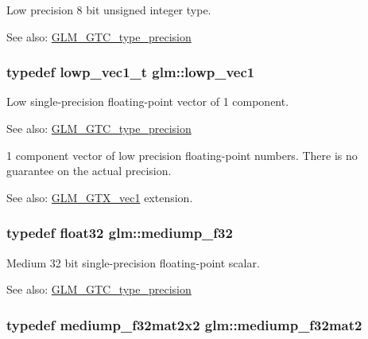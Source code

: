 Low precision 8 bit unsigned integer type. \begin{Desc}
\item[See also:]\hyperlink{group__gtc__type__precision}{GLM\_\-GTC\_\-type\_\-precision} \end{Desc}
\hypertarget{group__gtc__type__precision_ge48c64f920be353ece773ff367f0161c}{
\subsubsection[lowp\_\-vec1]{\setlength{\rightskip}{0pt plus 5cm}typedef lowp\_\-vec1\_\-t {\bf glm::lowp\_\-vec1}}}
\label{group__gtc__type__precision_ge48c64f920be353ece773ff367f0161c}


Low single-precision floating-point vector of 1 component. \begin{Desc}
\item[See also:]\hyperlink{group__gtc__type__precision}{GLM\_\-GTC\_\-type\_\-precision}\end{Desc}
1 component vector of low precision floating-point numbers. There is no guarantee on the actual precision. \begin{Desc}
\item[See also:]\hyperlink{group__gtx__vec1}{GLM\_\-GTX\_\-vec1} extension. \end{Desc}
\hypertarget{group__gtc__type__precision_g3dbba6bd06a546d7a11d1c09c2f04b1a}{
\subsubsection[mediump\_\-f32]{\setlength{\rightskip}{0pt plus 5cm}typedef float32 {\bf glm::mediump\_\-f32}}}
\label{group__gtc__type__precision_g3dbba6bd06a546d7a11d1c09c2f04b1a}


Medium 32 bit single-precision floating-point scalar. \begin{Desc}
\item[See also:]\hyperlink{group__gtc__type__precision}{GLM\_\-GTC\_\-type\_\-precision} \end{Desc}
\hypertarget{group__gtc__type__precision_g103735a38477f7c389b36aae0fbdf274}{
\subsubsection[mediump\_\-f32mat2]{\setlength{\rightskip}{0pt plus 5cm}typedef mediump\_\-f32mat2x2 {\bf glm::mediump\_\-f32mat2}}}
\label{group__gtc__type__precision_g103735a38477f7c389b36aae0fbdf274}



